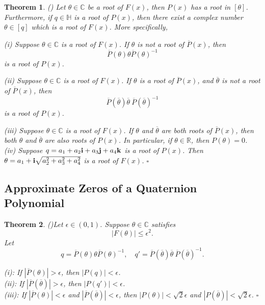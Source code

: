 \documentclass{article}
\newtheorem{thm}{Theorem}
\theoremstyle{definition}
\begin{document}
\begin{thm} \label{thmFx} {\rm (\cite{kalQ})} Let $\theta \in \mathbb{C}$ be a root of $F(x)$, then $P(x)$ has a root in $[\theta]$.
Furthermore, if $q \in \mathbb{H}$ is a root of $P(x)$, then there exist a complex number $\theta \in [q]$ which is a root of $F(x)$. More specifically,

(i) Suppose  $\theta \in \mathbb{C}$  is a root of
$F(x)$.  If $\theta$ is not a root of $\overline P (x)$, then
\begin{equation}
\overline P(\theta) \theta \overline P(\theta)^{-1}
\end{equation}
is a root of $P(x)$.

(ii) Suppose $\theta \in \mathbb{C}$ is a root of
$F(x)$. If $\theta$ is a root of $\overline P (x)$, and $\overline
\theta$ is not a root of $\overline P (x)$, then
\begin{equation}
\overline P(\overline \theta) \overline \theta ~\overline P(\overline \theta)^{-1}
\end{equation}
is a root of $P(x)$.

(iii) Suppose $\theta \in \mathbb{C}$ is a root of $F(x)$. If $\theta$  and $\overline \theta$ are both roots of $\overline P (x)$,  then both $\theta$ and $\overline \theta$ are also roots of $P(x)$. In particular, if $\theta \in \mathbb{R}$, then $P(\theta)=0$.\\

(iv) Suppose $q=a_1+a_2{\bf i}+a_3{\bf j}+a_4{\bf k}$
is a root of $P(x)$. Then $\theta=a_1+{\bf i}
\sqrt{a_2^2+a_3^2+a_4^2}$ is a root of $F(x)$. $\square$
\end{thm}


\subsection{Approximate Zeros of a Quaternion Polynomial}


\begin{thm} \label{Approx} {\rm (\cite{kalQ})}Let $\epsilon \in (0,1)$. Suppose $ \theta \in \mathbb{C}$ satisfies
\begin{equation}
|F(\theta)| \leq \epsilon^2.
\end{equation}
Let
\begin{equation}
q=\overline P(\theta) \theta \overline P(\theta)^{-1}, \quad q'=\overline P( \overline \theta)  \overline  \theta ~\overline P( \overline \theta)^{-1}.
\end{equation}

(i): If $|\overline P(\theta)| > \epsilon$, then $|P(q)| < \epsilon$.\\

(ii): If $|\overline P( \overline \theta)| > \epsilon$, then $|P(q')| < \epsilon$.\\

(iii): If $|\overline P(\theta)| < \epsilon$ and  $|\overline P(
\overline \theta)| < \epsilon$, then $|P(\theta)| < \sqrt{2} \epsilon$
and $|P(\overline \theta)| < \sqrt{2} \epsilon$. $\square$
\end{thm}
\end{document}
